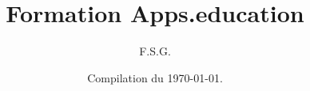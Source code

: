 \documentclass[a4paper, 11pt]{book}
\title{Formation Apps.education}
\author{F.S.G.}
\date{Compilation du \today{}.}
\renewcommand{\baselinestretch}{1.25}
\begin{document}
\begin{titlepage}
    \maketitle
\end{titlepage}















\newpage
\renewcommand{\baselinestretch}{1}
\setlength{\parskip}{0em}
\tableofcontents
\end{document}
